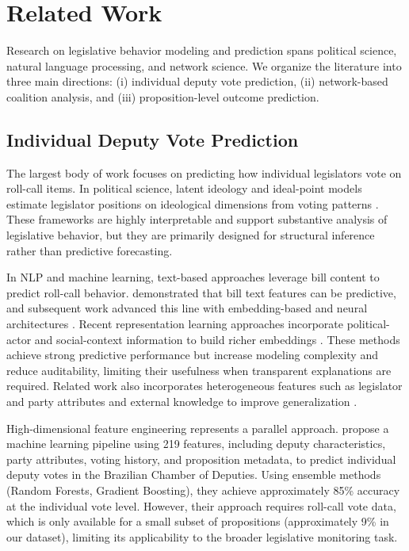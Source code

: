 \documentclass[review]{elsarticle}
\begin{document}
\section{Related Work}
\label{related_work}

Research on legislative behavior modeling and prediction spans political science, natural language processing, and network science. We organize the literature into three main directions: (i) individual deputy vote prediction, (ii) network-based coalition analysis, and (iii) proposition-level outcome prediction.

\subsection{Individual Deputy Vote Prediction}

The largest body of work focuses on predicting how individual legislators vote on roll-call items. In political science, latent ideology and ideal-point models estimate legislator positions on ideological dimensions from voting patterns \citep{Poole1985,Clinton2004}. These frameworks are highly interpretable and support substantive analysis of legislative behavior, but they are primarily designed for structural inference rather than predictive forecasting.

In NLP and machine learning, text-based approaches leverage bill content to predict roll-call behavior. \citet{Gerrish2011} demonstrated that bill text features can be predictive, and subsequent work advanced this line with embedding-based and neural architectures \citep{Kraft2021,Patil2020}. Recent representation learning approaches incorporate political-actor and social-context information to build richer embeddings \citep{Feng2022PAR}. These methods achieve strong predictive performance but increase modeling complexity and reduce auditability, limiting their usefulness when transparent explanations are required. Related work also incorporates heterogeneous features such as legislator and party attributes and external knowledge to improve generalization \citep{Kornilova2018,Cheng2017,MultiFactor2019}.


High-dimensional feature engineering represents a parallel approach. \citet{Albuquerque2025Forecasting} propose a machine learning pipeline using 219 features, including deputy characteristics, party attributes, voting history, and proposition metadata, to predict individual deputy votes in the Brazilian Chamber of Deputies. Using ensemble methods (Random Forests, Gradient Boosting), they achieve approximately 85\% accuracy at the individual vote level. However, their approach requires roll-call vote data, which is only available for a small subset of propositions (approximately 9\% in our dataset), limiting its applicability to the broader legislative monitoring task.
\end{document}
